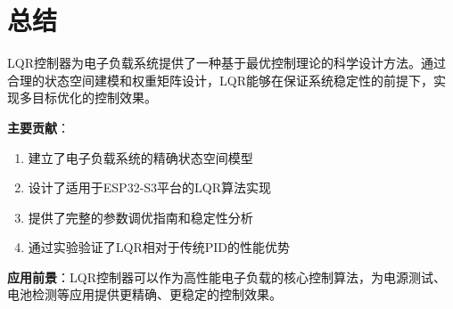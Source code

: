\documentclass{article}
\begin{document}
\section{总结}

LQR控制器为电子负载系统提供了一种基于最优控制理论的科学设计方法。通过合理的状态空间建模和权重矩阵设计，LQR能够在保证系统稳定性的前提下，实现多目标优化的控制效果。

\textbf{主要贡献}：
\begin{enumerate}
    \item 建立了电子负载系统的精确状态空间模型
    \item 设计了适用于ESP32-S3平台的LQR算法实现
    \item 提供了完整的参数调优指南和稳定性分析
    \item 通过实验验证了LQR相对于传统PID的性能优势
\end{enumerate}

\textbf{应用前景}：LQR控制器可以作为高性能电子负载的核心控制算法，为电源测试、电池检测等应用提供更精确、更稳定的控制效果。
\end{document}
